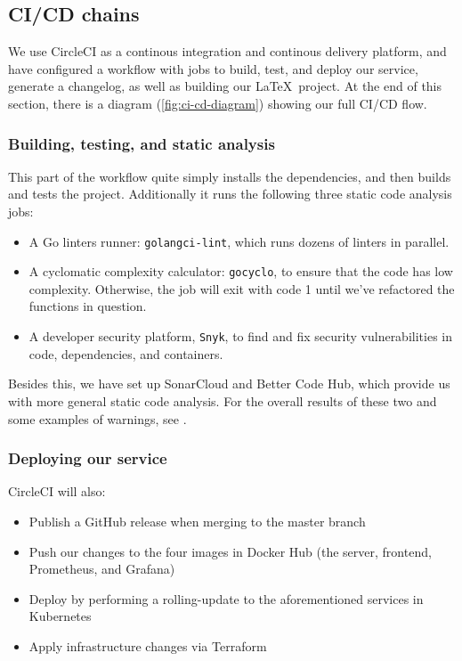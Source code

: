 \subsection{CI/CD chains}

We use CircleCI as a continous integration and continous delivery platform, and have configured a workflow \cite{workflow:circleci} with jobs to build, test, and deploy our service, generate a changelog, as well as building our \LaTeX\ project. At the end of this section, there is a diagram (\autoref{fig:ci-cd-diagram}) showing our full CI/CD flow.

\subsubsection{Building, testing, and static analysis}

This part of the workflow quite simply installs the dependencies, and then builds and tests the project. Additionally it runs the following three static code analysis jobs:
\begin{itemize}
    \item A Go linters runner: \texttt{golangci-lint}, which runs dozens of linters in parallel.
    \item A cyclomatic complexity calculator: \texttt{gocyclo}, to ensure that the code has low complexity. Otherwise, the job will exit with code 1 until we've refactored the functions in question.
    \item A developer security platform, \texttt{Snyk}, to find and fix security vulnerabilities in code, dependencies, and containers.
\end{itemize}

Besides this, we have set up SonarCloud and Better Code Hub, which provide us with more general static code analysis. For the overall results of these two and some examples of warnings, see .

\subsubsection{Deploying our service}

CircleCI will also:
\begin{itemize}
    \item Publish a GitHub release when merging to the master branch
    \item Push our changes to the four images in Docker Hub (the server, frontend, Prometheus, and Grafana)
    \item Deploy by performing a rolling-update to the aforementioned services in Kubernetes
    \item Apply infrastructure changes via Terraform
\end{itemize}


